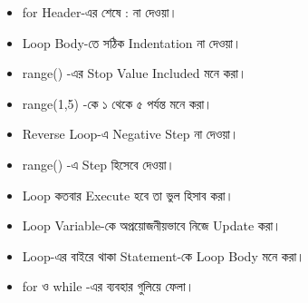 \begin{rememberbox}

\begin{itemize}

\item
\textenglish{\ttfamily for}
Header-এর শেষে
\textenglish{\ttfamily :}
না দেওয়া।

\item Loop Body-তে সঠিক Indentation না দেওয়া।

\item
\textenglish{\ttfamily range()}
-এর Stop Value Included মনে করা।

\item
\textenglish{\ttfamily range(1,5)}
-কে ১ থেকে ৫ পর্যন্ত মনে করা।

\item Reverse Loop-এ Negative Step না দেওয়া।

\item
\textenglish{\ttfamily range()}
-এ Step হিসেবে
\textenglish{}
দেওয়া।

\item Loop কতবার Execute হবে তা ভুল হিসাব করা।

\item Loop Variable-কে অপ্রয়োজনীয়ভাবে নিজে Update করা।

\item Loop-এর বাইরে থাকা Statement-কে Loop Body মনে করা।

\item
\textenglish{\ttfamily for}
ও
\textenglish{\ttfamily while}
-এর ব্যবহার গুলিয়ে ফেলা।

\end{itemize}

\end{rememberbox}


